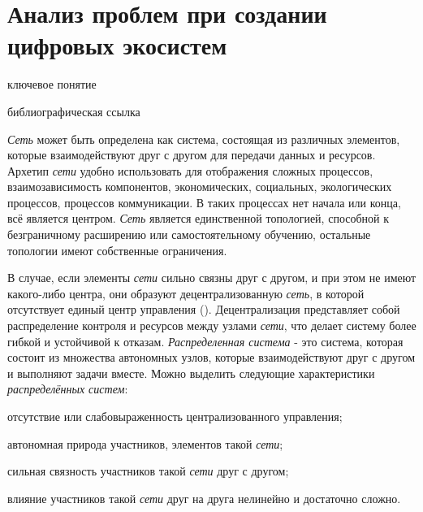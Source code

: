 \section{Анализ проблем при создании цифровых экосистем}
{\label{sec_ecosystem_analysis}} 

\begin{SCn}

\begin{scnrelfromlist}{ключевое понятие}
\end{scnrelfromlist}


\begin{scnrelfromlist}{библиографическая ссылка}
\end{scnrelfromlist}

\end{SCn}    

\textit{Сеть} может быть определена как система, состоящая из различных элементов, которые взаимодействуют друг с другом для передачи данных и ресурсов. Архетип \textit{сети} удобно использовать для отображения сложных процессов, взаимозависимость компонентов, экономических, социальных, экологических процессов, процессов коммуникации. В таких процессах нет начала или конца, всё является центром. \textit{Сеть} является единственной топологией, способной к безграничному расширению или самостоятельному обучению, остальные топологии имеют собственные ограничения.

В случае, если элементы \textit{сети} сильно связны друг с другом, и при этом не имеют какого-либо центра, они образуют децентрализованную \textit{сеть}, в которой отсутствует единый центр управления (). Децентрализация представляет собой распределение контроля и ресурсов между узлами \textit{сети}, что делает систему более гибкой и устойчивой к отказам. \textit{Распределенная система} - это система, которая состоит из множества автономных узлов, которые взаимодействуют друг с другом и выполняют задачи вместе.
Можно выделить следующие характеристики \textit{распределённых систем}:
\begin{textitemize}
    \item отсутствие или слабовыраженность централизованного управления;
    \item автономная природа участников, элементов такой \textit{сети};
    \item сильная связность участников такой \textit{сети} друг с другом;
    \item влияние участников такой \textit{сети} друг на друга нелинейно и достаточно сложно.
\end{textitemize}

